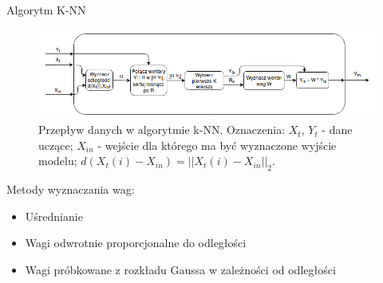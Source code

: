 \documentclass{beamer}
\begin{document}
\begin{frame}{Algorytm K-NN}
	\begin{figure}
		\includegraphics[width=\linewidth]{diagram_knn}
		\caption{Przepływ danych w algorytmie k-NN. Oznaczenia: $X_t$, $Y_t$ - dane uczące; $X_{in}$ - wejście dla którego ma być wyznaczone wyjście modelu; $d(X_t(i)-X_{in}) = ||X_t(i)-X_{in}||_{2} $.}
	\end{figure}
	Metody wyznaczania wag:
	\begin{itemize}
		\item Uśrednianie
		\item Wagi odwrotnie proporcjonalne do odległości
		\item Wagi próbkowane z rozkładu Gaussa w zależności od odległości
	\end{itemize}
\end{frame}
\end{document}
